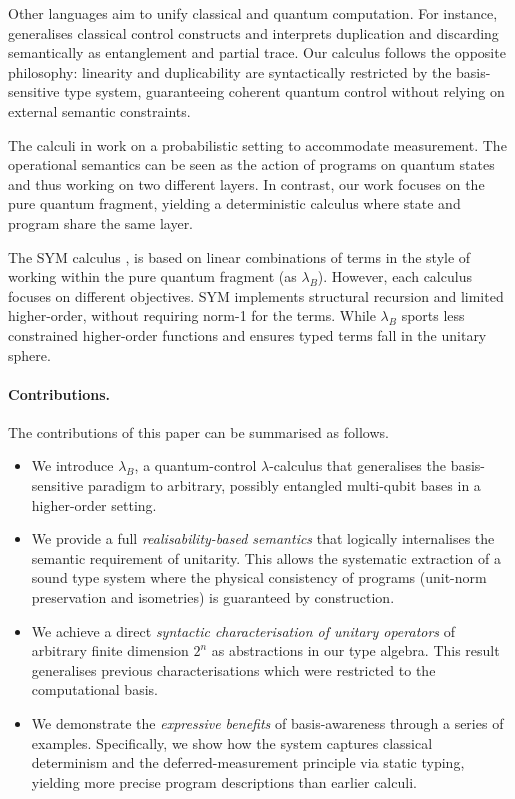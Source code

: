 \documentclass[a4paper,UKenglish,numberwithinsect,pdfa,anonymous]{lipics-v2021}
\theoremstyle{restatestyle}
\newcommand{\lambdaB}{\lambda_B}
\begin{document}
Other languages aim to unify classical and quantum computation.
For instance,~\cite{VoichickLiRandHicks2023} generalises classical
control constructs and interprets duplication and discarding semantically as
entanglement and partial trace. Our calculus follows the opposite philosophy: 
linearity and duplicability are syntactically restricted by the basis-sensitive 
type system, guaranteeing coherent quantum control without relying on external 
semantic constraints.

The calculi in \cite{DaveLemonnierPechouxZamdzhiev_2025, BarssePechouxPerdrix_2026} work 
on a probabilistic setting to accommodate measurement. The operational semantics can be
seen as the action of programs on quantum states and thus working on two different layers.
In contrast, our work focuses on the pure quantum fragment, yielding a deterministic
calculus where state and program share the same layer.

The SYM calculus \cite{SabryValironVizzotto_2018}, is based on linear combinations of
terms in the style of \cite{ArrighiDowekLMCS17} working within the pure quantum fragment
(as $\lambdaB$). However, each calculus focuses on different objectives. SYM implements 
structural recursion and limited higher-order, without requiring norm-1 for the terms. While 
$\lambdaB$ sports less constrained higher-order functions and ensures typed terms fall in the 
unitary sphere.

\paragraph*{Contributions.}
The contributions of this paper can be summarised as follows.
\begin{itemize}[nosep]
  \item We introduce $\lambdaB$, a quantum-control $\lambda$-calculus that 
  generalises the basis-sensitive paradigm to arbitrary, possibly entangled 
  multi-qubit bases in a higher-order setting.
  \item We provide a full \emph{realisability-based semantics} that 
  logically internalises the semantic requirement of unitarity. This allows 
  the systematic extraction of a sound type system where the physical consistency 
  of programs (unit-norm preservation and isometries) is guaranteed by 
  construction.
  \item We achieve a direct \emph{syntactic characterisation of unitary operators} 
  of arbitrary finite dimension $2^n$ as abstractions in our type algebra. 
  This result generalises previous characterisations which were restricted 
  to the computational basis.
  \item We demonstrate the \emph{expressive benefits} of basis-awareness 
  through a series of examples. Specifically, we show how the system captures 
  classical determinism and the deferred-measurement principle via static 
  typing, yielding more precise program descriptions than earlier calculi.
\end{itemize}
\end{document}
